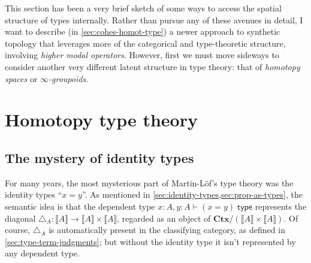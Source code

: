 \documentclass[12pt]{article}
\def\oo{\ensuremath{\infty}}
\def\ty{\;\mathsf{type}}
\def\m#1{\llbracket#1\rrbracket}
\def\types{\vdash}
\def\diag{\triangle}
\def\Ctx{\mathbf{Ctx}}
\numberwithin{equation}{section}
\begin{document}
This section has been a very brief sketch of some ways to access the spatial structure of types internally.
Rather than pursue any of these avenues in detail, I want to describe (in \cref{sec:cohes-homot-type}) a newer approach to synthetic topology that leverages more of the categorical and type-theoretic structure, involving \emph{higher modal operators}.
However, first we must move sideways to consider another very different latent structure in type theory: that of \emph{homotopy spaces} or \emph{\oo-groupoids}.


\section{Homotopy type theory}
\label{sec:homotopy-type-theory}

\subsection{The mystery of identity types}
\label{sec:myst-ident-types}

For many years, the most mysterious part of Martin-L\"{o}f's type theory was the identity types ``$x=y$''.
As mentioned in \cref{sec:identity-types,sec:prop-as-types}, the semantic idea is that the dependent type $x:A,y:A\types (x=y)\ty$ represents the diagonal $\diag_A:\m A \to \m A\times \m A$, regarded as an object of $\Ctx/(\m A\times \m A)$. %
Of course, $\diag_A$ is automatically present in the classifying category, as defined in \cref{sec:type-term-judgments}; but without the identity type it isn't represented by any dependent type.
\end{document}
